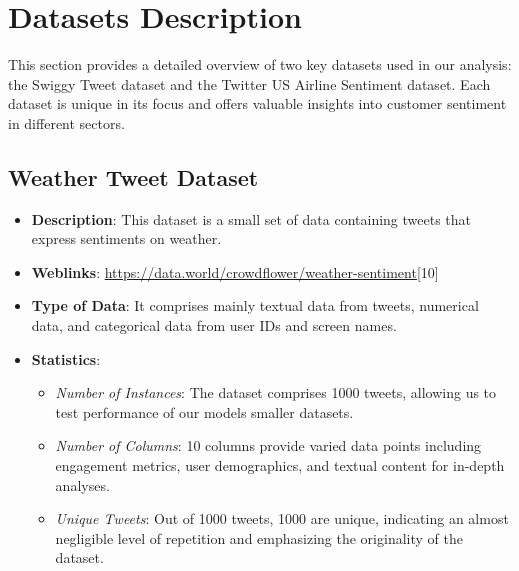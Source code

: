 \documentclass[conference]{IEEEtran}
\begin{document}
\section{Datasets Description}
This section provides a detailed overview of two key datasets used in our analysis: the Swiggy Tweet dataset and the Twitter US Airline Sentiment dataset. 
Each dataset is unique in its focus and offers valuable insights into customer sentiment in different sectors.

\subsection{Weather Tweet Dataset}
\begin{itemize}
    \item \textbf{Description}: This dataset is a small set of data containing tweets that express sentiments on weather.
    
    \item \textbf{Weblinks}: \url{https://data.world/crowdflower/weather-sentiment}[10]
    
    \item \textbf{Type of Data}: It comprises mainly textual data from tweets, numerical data, and categorical data from user IDs and screen names.
    
    \item \textbf{Statistics}:
    \begin{itemize}
        \item \textit{Number of Instances}: The dataset comprises 1000 tweets, allowing us to test performance of our models smaller datasets.
        \item \textit{Number of Columns}: 10 columns provide varied data points including engagement metrics, user demographics, and textual content for in-depth analyses.
        \item \textit{Unique Tweets}: Out of 1000 tweets, 1000 are unique, indicating an almost negligible level of repetition and emphasizing the originality of the dataset.

    \end{itemize}
\end{itemize}
\end{document}
